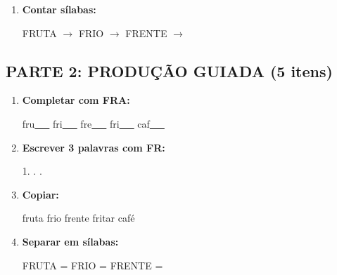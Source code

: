\begin{exercicio}
\begin{enumerate}
  \item \textbf{Contar sílabas:}
  \begin{center}
  FRUTA $\rightarrow$ \underline{\hspace{0.9cm}} \quad FRIO $\rightarrow$ \underline{\hspace{0.9cm}} \quad FRENTE $\rightarrow$ \underline{\hspace{0.9cm}}
  \end{center}

\end{enumerate}

\subsection*{PARTE 2: PRODUÇÃO GUIADA (5 itens)}

\begin{enumerate}[resume]

  \item \textbf{Completar com FRA:}
  \begin{center}
  fru\underline{~~~} \quad fri\underline{~~~} \quad fre\underline{~~~} \quad fri\underline{~~~} \quad caf\underline{~~~}
  \end{center}

  \item \textbf{Escrever 3 palavras com FR:}
  \begin{center}
  1. \underline{\hspace{3cm}} . \underline{\hspace{3cm}} . \underline{\hspace{3cm}}
  \end{center}

  \item \textbf{Copiar:}
  \begin{center}
  fruta \quad frio \quad frente \quad fritar \quad café
  \end{center}

  \item \textbf{Separar em sílabas:}
  \begin{center}
  FRUTA = \underline{\hspace{1cm}} \underline{\hspace{1cm}} \quad FRIO = \underline{\hspace{1cm}} \underline{\hspace{1cm}} \quad FRENTE = \underline{\hspace{1cm}} \underline{\hspace{1cm}}
  \end{center}


\end{enumerate}
\end{exercicio}
